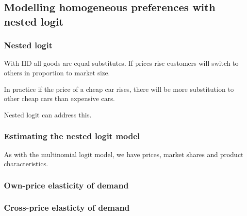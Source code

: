 
\subsection{Modelling homogeneous preferences with nested logit}

\subsubsection{Nested logit}

With IID all goods are equal substitutes. If prices rise customers will switch to others in proportion to market size.

In practice if the price of a cheap car rises, there will be more substitution to other cheap cars than expensive cars.

Nested logit can address this.

\subsubsection{Estimating the nested logit model}

As with the multinomial logit model, we have prices, market shares and product characteristics.

\subsubsection{Own-price elasticity of demand}

\subsubsection{Cross-price elasticty of demand}



